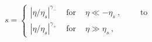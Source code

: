 \begin{equation}
 s = \left\{\begin{array}{lcl}
  |\eta/\eta_s|^{\gamma_-} &\mbox{ for }& \eta\ll -\eta_s ~,
  \qquad \mbox{ to}\\[2mm]
  |\eta/\eta_s|^{\gamma_+} &\mbox{ for }& \eta\gg \eta_s ~,
\end{array}\right.
\end{equation}

